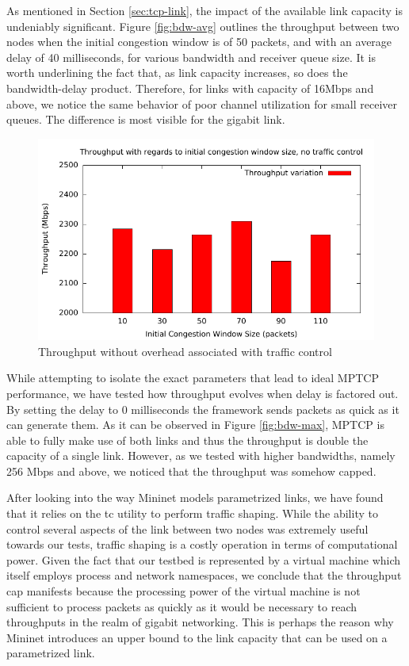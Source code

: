 As mentioned in Section \ref{sec:tcp-link}, the impact of the available link
capacity is undeniably significant. Figure \ref{fig:bdw-avg} outlines the
throughput between two nodes when the initial congestion window is of 50
packets, and with an average delay of 40 milliseconds, for various bandwidth
and receiver queue size. It is worth underlining the fact that, as link
capacity increases, so does the bandwidth-delay product. Therefore, for links
with capacity of 16Mbps and above, we notice the same behavior of poor channel
utilization for small receiver queues. The difference is most visible for the
gigabit link.

\begin{figure}
  \centering
  \includegraphics[width=\textwidth]{img/throughput-cwnd-notc}
  \caption{Throughput without overhead associated with traffic control}
  \label{fig:cwnd-notc}
\end{figure}

While attempting to isolate the exact parameters that lead to ideal MPTCP
performance, we have tested how throughput evolves when delay is factored
out. By setting the delay to 0 milliseconds the framework sends packets as
quick as it can generate them. As it can be observed in Figure
\ref{fig:bdw-max}, MPTCP is able to fully make use of both links and thus the
throughput is double the capacity of a single link. However, as we tested with
higher bandwidths, namely 256 Mbps and above, we noticed that the throughput
was somehow capped.

After looking into the way Mininet models parametrized links, we have found
that it relies on the tc utility to perform traffic shaping. While the ability
to control several aspects of the link between two nodes was extremely useful
towards our tests, traffic shaping is a costly operation in terms of
computational power. Given the fact that our testbed is represented by a
virtual machine which itself employs process and network namespaces, we
conclude that the throughput cap manifests because the processing power of the
virtual machine is not sufficient to process packets as quickly as it would be
necessary to reach throughputs in the realm of gigabit networking. This is
perhaps the reason why Mininet introduces an upper bound to the link capacity
that can be used on a parametrized link.

